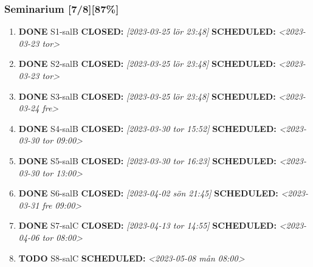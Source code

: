 \documentclass[11pt]{article}
\begin{document}
\subsubsection{Seminarium [7/8][87\%]}
\label{sec:org1187dac}
\begin{enumerate}
\item {\bfseries\sffamily DONE} S1-salB
\label{sec:orgbb94fac}
\noindent\textbf{CLOSED:} \textit{[2023-03-25 lör 23:48] } \textbf{SCHEDULED:} \textit{<2023-03-23 tor>}\\[0pt]
\item {\bfseries\sffamily DONE} S2-salB
\label{sec:orge4d6506}
\noindent\textbf{CLOSED:} \textit{[2023-03-25 lör 23:48] } \textbf{SCHEDULED:} \textit{<2023-03-23 tor>}\\[0pt]
\item {\bfseries\sffamily DONE} S3-salB
\label{sec:org286d6c8}
\noindent\textbf{CLOSED:} \textit{[2023-03-25 lör 23:48] } \textbf{SCHEDULED:} \textit{<2023-03-24 fre>}\\[0pt]
\item {\bfseries\sffamily DONE} S4-salB
\label{sec:org778ddc8}
\noindent\textbf{CLOSED:} \textit{[2023-03-30 tor 15:52] } \textbf{SCHEDULED:} \textit{<2023-03-30 tor 09:00>}\\[0pt]
\item {\bfseries\sffamily DONE} S5-salB
\label{sec:org83efd22}
\noindent\textbf{CLOSED:} \textit{[2023-03-30 tor 16:23] } \textbf{SCHEDULED:} \textit{<2023-03-30 tor 13:00>}\\[0pt]
\item {\bfseries\sffamily DONE} S6-salB
\label{sec:orge02a899}
\noindent\textbf{CLOSED:} \textit{[2023-04-02 sön 21:45] } \textbf{SCHEDULED:} \textit{<2023-03-31 fre 09:00>}\\[0pt]
\item {\bfseries\sffamily DONE} S7-salC
\label{sec:org70cbbac}
\noindent\textbf{CLOSED:} \textit{[2023-04-13 tor 14:55] } \textbf{SCHEDULED:} \textit{<2023-04-06 tor 08:00>}\\[0pt]
\item {\bfseries\sffamily TODO} S8-salC
\label{sec:org487c04b}
\noindent\textbf{SCHEDULED:} \textit{<2023-05-08 mån 08:00>}\\[0pt]
\end{enumerate}
\end{document}
